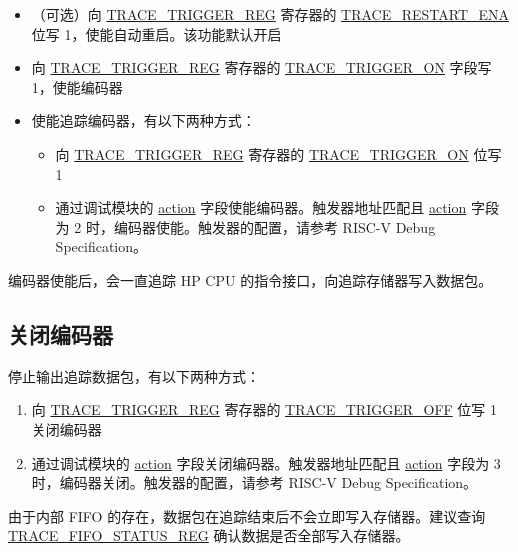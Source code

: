 \documentclass[main\_\_CN.tex]{subfiles}
\begin{document}
\begin{itemize}
    \item（可选）向 \hyperref[regdesc:TRACETRIGGERREG]{TRACE\_TRIGGER\_REG} 寄存器的 \hyperref[fielddesc:TRACERESTARTENA]{TRACE\_RESTART\_ENA} 位写 1，使能自动重启。该功能默认开启

    \item 向 \hyperref[regdesc:TRACETRIGGERREG]{TRACE\_TRIGGER\_REG} 寄存器的 \hyperref[fielddesc:TRACETRIGGERON]{TRACE\_TRIGGER\_ON} 字段写 1，使能编码器

    \item 使能追踪编码器，有以下两种方式：
        \begin{itemize}
            \item 向 \hyperref[regdesc:TRACETRIGGERREG]{TRACE\_TRIGGER\_REG} 寄存器的 \hyperref[fielddesc:TRACETRIGGERON]{TRACE\_TRIGGER\_ON} 位写 1
            \item 通过调试模块的 \hyperref[fielddesc:MCONTROLACTION]{action} 字段使能编码器。触发器地址匹配且 \hyperref[fielddesc:MCONTROLACTION]{action} 字段为 2 时，编码器使能。触发器的配置，请参考 RISC-V Debug Specification。
    \end{itemize}
\end{itemize}

编码器使能后，会一直追踪 HP CPU 的指令接口，向追踪存储器写入数据包。

\subsection{关闭编码器}

停止输出追踪数据包，有以下两种方式：
\begin{enumerate}
    \item 向 \hyperref[regdesc:TRACETRIGGERREG]{TRACE\_TRIGGER\_REG} 寄存器的 \hyperref[fielddesc:TRACETRIGGEROFF]{TRACE\_TRIGGER\_OFF} 位写 1 关闭编码器
    \item 通过调试模块的 \hyperref[fielddesc:MCONTROLACTION]{action} 字段关闭编码器。触发器地址匹配且 \hyperref[fielddesc:MCONTROLACTION]{action} 字段为 3 时，编码器关闭。触发器的配置，请参考 RISC-V Debug Specification。
\end{enumerate}

由于内部 FIFO 的存在，数据包在追踪结束后不会立即写入存储器。建议查询\hyperref[regdesc:TRACEFIFOSTATUSREG]{TRACE\_FIFO\_STATUS\_REG} 确认数据是否全部写入存储器。
\end{document}

